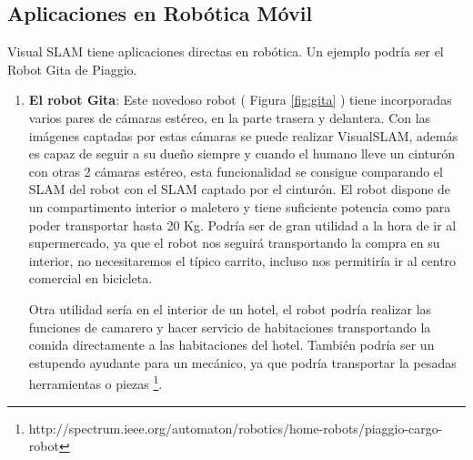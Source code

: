 \subsection{Aplicaciones en Robótica Móvil}
Visual SLAM tiene aplicaciones directas en robótica. Un ejemplo podría ser el Robot Gita de Piaggio.
\begin {enumerate}
\item \textbf{El robot Gita}: Este novedoso robot ( Figura \ref{fig:gita} ) tiene incorporadas varios pares de cámaras estéreo, en la parte trasera y delantera. Con las imágenes captadas por estas cámaras se puede realizar VisualSLAM, además es capaz de seguir a su dueño siempre y cuando el humano lleve un cinturón con otras 2 cámaras estéreo, esta funcionalidad se consigue comparando el SLAM del robot con el SLAM captado por el cinturón.
El robot dispone de un compartimento interior o maletero y tiene suficiente potencia como para poder transportar hasta 20 Kg. Podría ser de gran utilidad a la hora de ir al supermercado, ya que el robot nos seguirá transportando la compra en su interior, no necesitaremos el típico carrito, incluso nos permitiría ir al centro comercial en bicicleta.

 Otra utilidad sería en el interior de un hotel, el robot podría realizar las funciones de camarero y hacer servicio de habitaciones transportando la comida directamente a las habitaciones del hotel. También podría ser un estupendo ayudante para un mecánico, ya que podría transportar la pesadas herramientas o piezas
\footnote{http://spectrum.ieee.org/automaton/robotics/home-robots/piaggio-cargo-robot}.



\end{enumerate}
